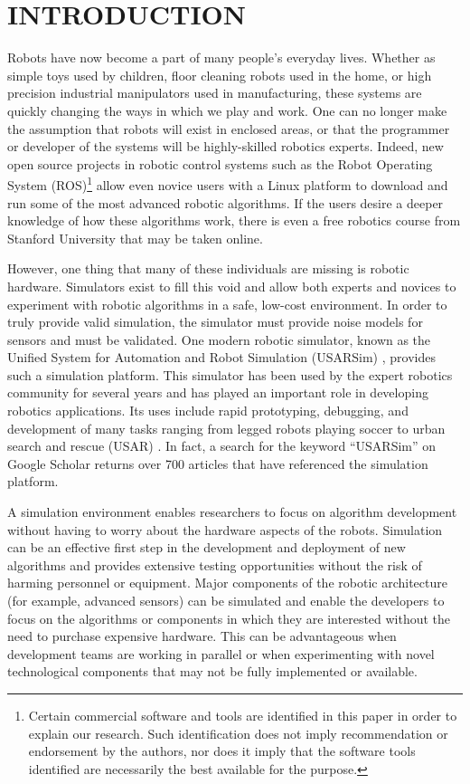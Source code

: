 \section*{INTRODUCTION}
Robots have now become a part of many people's everyday lives. Whether as simple toys used by children, floor cleaning robots used in the home, or high precision industrial manipulators used in manufacturing, these systems are quickly changing the ways in which we play and work. One can no longer make the assumption that robots will exist in enclosed areas, or that the programmer or developer of the systems will be highly-skilled robotics experts. Indeed, new open source projects in robotic control systems such as the Robot Operating System (ROS)\footnote{Certain commercial software and tools are identified in this paper in order to explain our research. Such identification does not imply recommendation or endorsement by the authors, nor does it imply that the software tools identified are necessarily the best available for the purpose.}\cite{ROSWeb} allow even novice users with a Linux platform to download and run some of the most advanced robotic algorithms. If the users desire a deeper knowledge of how these algorithms work, there is even a free robotics course from Stanford University that may be taken online.

However, one thing that many of these individuals are missing is robotic hardware. Simulators exist to fill this void and allow both experts and novices to experiment with robotic algorithms in a safe, low-cost environment. In order to truly provide valid simulation, the simulator must provide noise models for sensors and must be validated. One modern robotic simulator, known as the Unified System for Automation and Robot Simulation (USARSim) \cite{USARSimWeb},  provides such a simulation platform. This simulator has been used by the expert robotics community for several years and has played an important role in developing robotics applications. Its uses include rapid prototyping, debugging, and development of many tasks ranging from legged robots playing soccer \cite{ZARATTI.LNAI.2007} to urban search and rescue (USAR) \cite{CARPIN.LNAI.2006,WANG.WSC.2003}. In fact, a search for the keyword ``USARSim'' on Google Scholar returns over 700 articles that have referenced the simulation platform.

A simulation environment enables researchers to focus on algorithm development without having to worry about the hardware aspects of the robots. Simulation can be an effective first step in the development and deployment of new algorithms and provides extensive testing opportunities without the risk of harming personnel or equipment. Major components of the robotic architecture (for example, advanced sensors) can be simulated and enable the developers to focus on the algorithms or components in which they are interested without the need to purchase expensive hardware. This can be advantageous when development teams are working in parallel or when experimenting with novel technological components that may not be fully implemented or available.

